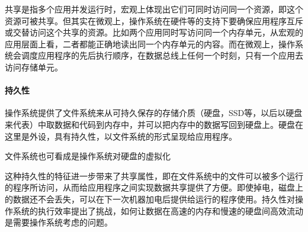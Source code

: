 共享是指多个应用并发运行时，宏观上体现出它们可同时访问同一个资源，即这个资源可被共享。但其实在微观上，操作系统在硬件等的支持下要确保应用程序互斥或交替访问这个共享的资源。比如两个应用同时写访问同一个内存单元，从宏观的应用层面上看，二者都能正确地读出同一个内存单元的内容。而在微观上，操作系统会调度应用程序的先后执行顺序，在数据总线上任何一个时刻，只有一个应用去访问存储单元。

\paragraph{持久性}

操作系统提供了文件系统来从可持久保存的存储介质（硬盘，SSD等，以后以硬盘来代表）中取数据和代码到内存中，并可以把内存中的数据写回到硬盘上。硬盘在这里是外设，具有持久性，以文件系统的形式呈现给应用程序。

文件系统也可看成是操作系统对硬盘的虚拟化  

这种持久性的特征进一步带来了共享属性，即在文件系统中的文件可以被多个运行的程序所访问，从而给应用程序之间实现数据共享提供了方便。即使掉电，磁盘上的数据还不会丢失，可以在下一次机器加电后提供给运行的程序使用。持久性对操作系统的执行效率提出了挑战，如何让数据在高速的内存和慢速的硬盘间高效流动是需要操作系统考虑的问题。




